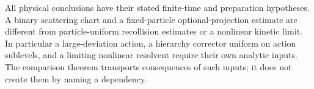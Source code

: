 All physical conclusions have their stated finite-time and
preparation hypotheses. A binary scattering chart and a fixed-particle
optional-projection estimate are different from particle-uniform
recollision estimates or a nonlinear kinetic limit. In particular a
large-deviation action, a hierarchy corrector uniform on action
sublevels, and a limiting nonlinear resolvent require their own
analytic inputs. The comparison theorem transports consequences of
such inputs; it does not create them by naming a dependency.
